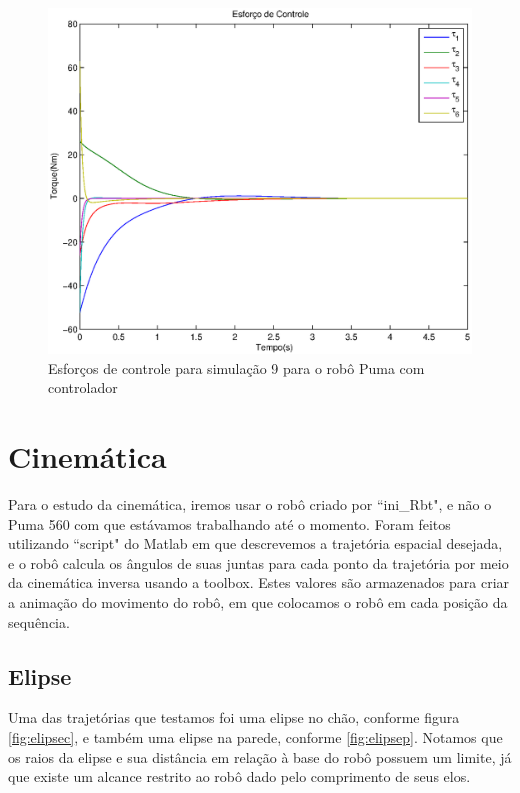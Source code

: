 \documentclass{article}
\begin{document}
\begin{figure}[H]
	\centering
	\includegraphics[width=0.8\linewidth]{../sim3clu}
	\caption{Esforços de controle para simulação 9 para o robô Puma com controlador}
	\label{fig:pumasim9clu}
\end{figure}


\section{Cinemática}
Para o estudo da cinemática, iremos usar o robô criado por ``ini\_Rbt"\cite{bb:inirbt}, e não o Puma 560 com que estávamos trabalhando até o momento. Foram feitos utilizando ``script" do Matlab em que descrevemos a trajetória espacial desejada, e o robô calcula os ângulos de suas juntas para cada ponto da trajetória por meio da cinemática inversa usando a toolbox\cite{bb:toolbox}. Estes valores são armazenados para criar a animação do movimento do robô, em que colocamos o robô em cada posição da sequência.

\subsection{Elipse}
Uma das trajetórias que testamos foi uma elipse no chão, conforme figura \ref{fig:elipsec}, e também uma elipse na parede, conforme \ref{fig:elipsep}. Notamos que os raios da elipse e sua distância em relação à base do robô possuem um limite, já que existe um alcance restrito ao robô dado pelo comprimento de seus elos.
\end{document}
